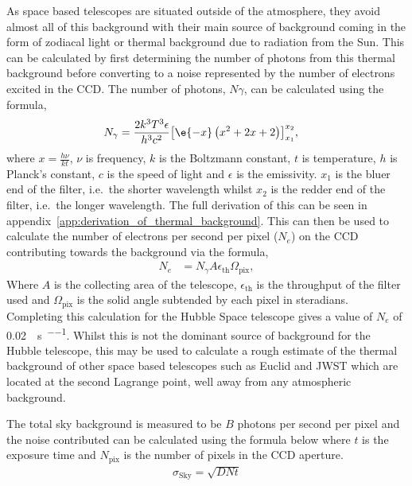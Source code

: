 		As space based telescopes are situated outside of the atmosphere, they avoid almost all of this background with their main source of background coming in the form of zodiacal light or thermal background due to radiation from the Sun. This can be calculated by first determining the number of photons from this thermal background before converting to a noise represented by the number of electrons excited in the CCD. The number of photons, $N\gamma$, can be calculated using the formula,
		\begin{align}
			N_\gamma &= \frac{2k^3 T^3 \epsilon}{h^3 c^2} {\left[ \e{-x}\left( x^2 + 2x + 2 \right) \right]}^{x_2}_{x_1},
		\end{align}
		where $x=\frac{h\nu}{kt}$, $\nu$ is frequency, $k$ is the Boltzmann constant, $t$ is temperature, $h$ is Planck's constant, $c$ is the speed of light and $\epsilon$ is the emissivity. $x_1$ is the bluer end of the filter, i.e.\ the shorter wavelength whilst $x_2$ is the redder end of the filter, i.e.\ the longer wavelength. The full derivation of this can be seen in appendix~\ref{app:derivation_of_thermal_background}. This can then be used to calculate the number of electrons per second per pixel ($N_e$) on the CCD contributing towards the background via the formula,
		\begin{align}
			N_e &= N_\gamma A\epsilon_{\text{th}}\Omega_{\text{pix}},
		\end{align}
		Where $A$ is the collecting area of the telescope, $\epsilon_{\text{th}}$ is the throughput of the filter used and $\Omega_{\text{pix}}$ is the solid angle subtended by each pixel in steradians. Completing this calculation for the Hubble Space telescope gives a value of $N_e$ of \SI{0.02}{\electron\per\second\per\pixel}. Whilst this is not the dominant source of background for the Hubble telescope, this may be used to calculate a rough estimate of the thermal background of other space based telescopes such as Euclid and JWST which are located at the second Lagrange point, well away from any atmospheric background.

		The total sky background is measured to be $B$ photons per second per pixel and the noise contributed can be calculated using the formula below where $t$ is the exposure time and $N_\text{pix}$ is the number of pixels in the CCD aperture.
		\begin{align}
			\sigma_\text{Sky} = \sqrt{DNt}
		\end{align}

